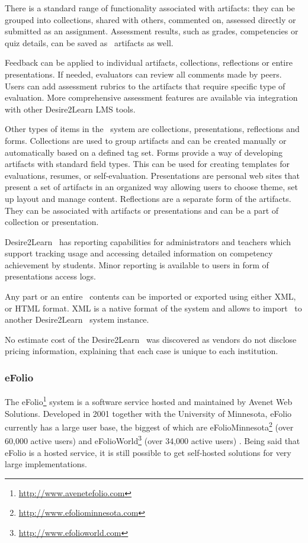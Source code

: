 There is a standard range of functionality associated with artifacts: they can
be grouped into collections, shared with others, commented on, assessed directly
or submitted as an assignment. Assessment results, such as grades, competencies
or quiz details, can be saved as \ep~artifacts as well.

Feedback can be applied to individual artifacts, collections, reflections or
entire presentations. If needed, evaluators can review all comments made by
peers. Users can add assessment rubrics to the artifacts that require specific
type of evaluation. More comprehensive assessment features are available via
integration with other Desire2Learn LMS tools.

Other types of items in the \ep~system are collections, presentations,
reflections and forms. Collections are used to group artifacts and can be
created manually or automatically based on a defined tag set. Forms provide a
way of developing artifacts with standard field types. This can be used for
creating templates for evaluations, resumes, or self-evaluation. Presentations
are personal web sites that present a set of artifacts in an organized way
allowing users to choose theme, set up layout and manage content. Reflections
are a separate form of the artifacts. They can be associated with artifacts or
presentations and can be a part of collection or presentation.

Desire2Learn \ep~has reporting capabilities for administrators and teachers which
support tracking usage and accessing detailed information on competency
achievement by students. Minor reporting is available to users in form of
presentations access logs.

Any part or an entire \ep~contents can be imported or exported using
either XML, or HTML format. XML is a native format of the system and allows to
import \ep~to another Desire2Learn \ep~system instance.

No estimate cost of the Desire2Learn \ep~was discovered as vendors do not
disclose pricing information, explaining that each case is unique to each
institution.
 
\subsubsection{eFolio}

The eFolio\footnote{\url{http://www.avenetefolio.com}} system is a software
service hosted and maintained by Avenet Web Solutions. Developed in 2001
together with the University of Minnesota, eFolio currently has a large user
base, the biggest of which are
eFolioMinnesota\footnote{\url{http://www.efoliominnesota.com}} (over 60,000
active users) and eFolioWorld\footnote{\url{http://www.efolioworld.com}} (over
34,000 active users) \citep{AAEEBL2011}. Being said that eFolio is a hosted
service, it is still possible to get self-hosted solutions for very large
implementations.

